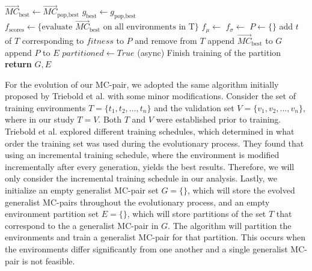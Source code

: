 \begin{algorithm}
\begin{algorithmic}[1]
                        \State $\overrightarrow{MC}_{\text{best}} \gets \overrightarrow{MC}_{\text{pop,best}}$
                        \State $g_{\text{best}} \gets g_{\text{pop,best}}$
                    \EndIf
                    \State {}
                    \State
                        \State $f_{\text{scores}} \gets \{\text{evaluate } \overrightarrow{MC}_{\text{best}} \text{ on all environments in } $T$\}$
                        \State $f_{\mu} \gets$ 
                        \State $f_{\sigma} \gets$ 
                        \State $P \gets \{\}$
                                \State add $t$ of $T$ corresponding to $fitness$ to $P$ and remove from $T$
                            \EndIf
                        \EndFor
                        \State append $\overrightarrow{MC}_{\text{best}}$ to $G$
                        \State append $P$ to $E$
                        \State $partitioned \gets True$
                        \State (async) Finish training of the partition
                    \EndIf
                \EndWhile
            \EndWhile
            \State {} %
            \State \textbf{return} $G,E$
        \end{algorithmic}
        \end{algorithm}
        
        For the evolution of our MC-pair, we adopted the same algorithm initially proposed by Triebold et al. \cite{Corinna_Triebold} with some minor modifications. Consider the set of training environments $T = \{t_1, t_2, \ldots, t_n\}$ and the validation set $V = \{v_1, v_2, \ldots, v_n\}$, where in our study $T = V$. Both $T$ and $V$ were established prior to training. Triebold et al. explored different training schedules, which determined in what order the training set was used during the evolutionary process. They found that using an incremental training schedule, where the environment is modified incrementally after every generation, yields the best results. Therefore, we will only consider the incremental training schedule in our analysis. Lastly, we initialize an empty generalist MC-pair set $G = \{\}$, which will store the evolved generalist MC-pairs throughout the evolutionary process, and an empty environment partition set $E = \{\}$, which will store partitions of the set $T$ that correspond to the a generalist MC-pair in $G$. The algorithm will partition the environments and train a generalist MC-pair for that partition. This occurs when the environments differ significantly from one another and a single generalist MC-pair is not feasible. 

